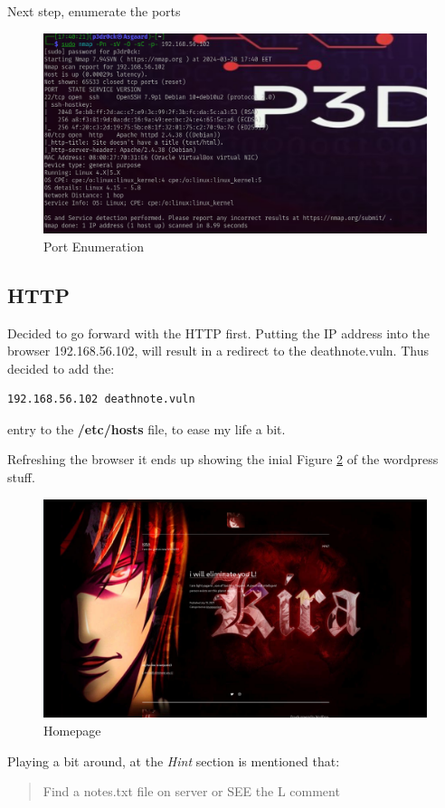 \documentclass[a4paper,12pt]{article}
\newcommand{\ip}{192.168.56.102}
\begin{document}
Next step, enumerate the ports
\begin{figure}[ht!]
	\includegraphics[width=\linewidth]{img/port_enumeration.png}
	\caption{Port Enumeration}
	\label{fig:port_enum}
\end{figure}

\subsection*{HTTP}
Decided to go forward with the HTTP first.
Putting the IP address into the browser \ip, will result in a redirect to the deathnote.vuln.
Thus decided to add the:
\begin{verbatim}
192.168.56.102 deathnote.vuln
\end{verbatim}
entry to the \textbf{/etc/hosts} file, to ease my life a bit.


Refreshing the browser it ends up showing the inial Figure \ref{fig:homepage} of the wordpress stuff.
\begin{figure}[t]
	\includegraphics[width=\linewidth]{img/browser_00.png}
	\caption{Homepage}
	\label{fig:homepage}
\end{figure}
Playing a bit around, at the \textit{Hint} section is mentioned that:
\begin{quotation}
Find a notes.txt file on server
or
SEE the L comment 
\end{quotation}
\end{document}
